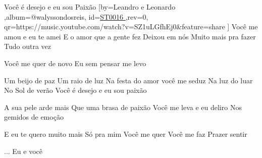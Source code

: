 \beginsong
{Você é desejo e eu sou Paixão %
}[by={Leandro e Leonardo %
},album={@walyssondosreis},
id={\href{https://music.youtube.com/watch?v=SZ1uLGfhEj0&feature=share %
}{ST0016 %
}},rev={0}, %
qr={https://music.youtube.com/watch?v=SZ1uLGfhEj0&feature=share %
}]
\beginverse
Você me amou e eu te amei
E o amor que a gente fez
Deixou em nós
Muito mais pra fazer
Tudo outra vez
\endverse

\beginverse
Você me quer de novo
Eu sem pensar me levo
\endverse

\beginchorus
Um beijo de paz
Um raio de luz
Na festa do amor você me seduz
Na luz do luar
No Sol de verão
Você é desejo e eu sou paixão
\endchorus

\beginverse
A sua pele arde mais
Que uma brasa de paixão
Você me leva e eu deliro
Nos gemidos de emoção
\endverse

\beginverse
E eu te quero muito mais
Só pra mim
Você me quer
Você me faz
Prazer sentir
\endverse

\beginverse
... Eu e você
\endverse


